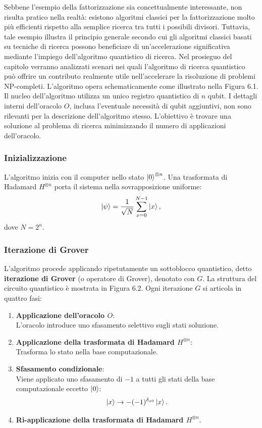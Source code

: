 \documentclass[a4paper,12pt]{report}
\theoremstyle{plain}
\begin{document}
Sebbene l'esempio della fattorizzazione sia concettualmente interessante, non risulta pratico nella realtà: esistono algoritmi classici per la fattorizzazione molto più efficienti rispetto alla semplice ricerca tra tutti i possibili divisori. Tuttavia, tale esempio illustra il principio generale secondo cui gli algoritmi classici basati su tecniche di ricerca possono beneficiare di un'accelerazione significativa mediante l'impiego dell'algoritmo quantistico di ricerca.
Nel prosieguo del capitolo verranno analizzati scenari nei quali l'algoritmo di ricerca quantistico può offrire un contributo realmente utile nell'accelerare la risoluzione di problemi NP-completi.
L'algoritmo opera schematicamente come illustrato nella Figura 6.1. Il nucleo dell'algoritmo utilizza un unico registro quantistico di $n$ qubit. I dettagli interni dell'oracolo $O$, inclusa l'eventuale necessità di qubit aggiuntivi, non sono rilevanti per la descrizione dell'algoritmo stesso. L'obiettivo è trovare una soluzione al problema di ricerca minimizzando il numero di applicazioni dell'oracolo.
\subsubsection{Inizializzazione}
L'algoritmo inizia con il computer nello stato $\ket{0}^{\otimes n}$. Una trasformata di Hadamard $H^{\otimes n}$ porta il sistema nella sovrapposizione uniforme:
\begin{equation}
\ket{\psi} = \frac{1}{\sqrt{N}}\sum_{x=0}^{N-1}\ket{x},
\end{equation}
dove $N = 2^n$.
\subsubsection{Iterazione di Grover}
L'algoritmo procede applicando ripetutamente un sottoblocco quantistico, detto \textbf{iterazione di Grover} (o operatore di Grover), denotato con $G$. La struttura del circuito quantistico è mostrata in Figura 6.2. Ogni iterazione $G$ si articola in quattro fasi:
\begin{enumerate}
    \item \textbf{Applicazione dell'oracolo $O$}: \\
    L'oracolo introduce uno sfasamento selettivo sugli stati soluzione.
    
    \item \textbf{Applicazione della trasformata di Hadamard $H^{\otimes n}$}: \\
    Trasforma lo stato nella base computazionale.
    
    \item \textbf{Sfasamento condizionale}: \\
    Viene applicato uno sfasamento di $-1$ a tutti gli stati della base computazionale eccetto $\ket{0}$:
    \[
    \ket{x} \to -(-1)^{\delta_{x0}} \ket{x}.
    \]
    
    \item \textbf{Ri-applicazione della trasformata di Hadamard $H^{\otimes n}$}.
\end{enumerate}
\end{document}
